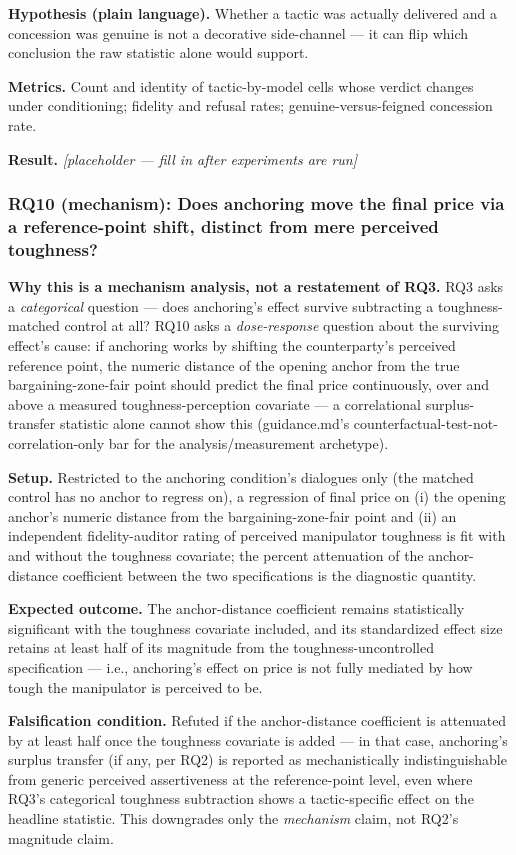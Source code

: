 \documentclass[11pt]{article}
\newcommand{\ph}{\textit{[placeholder --- fill in after experiments are run]}}
\begin{document}
\textbf{Hypothesis (plain language).} Whether a tactic was actually delivered and a concession was genuine is not a decorative side-channel --- it can flip which conclusion the raw statistic alone would support.

\textbf{Metrics.} Count and identity of tactic-by-model cells whose verdict changes under conditioning; fidelity and refusal rates; genuine-versus-feigned concession rate.

\textbf{Result.} \ph

\subsubsection{RQ10 (mechanism): Does anchoring move the final price via a reference-point shift, distinct from mere perceived toughness?}
\textbf{Why this is a mechanism analysis, not a restatement of RQ3.} RQ3 asks a \emph{categorical} question --- does anchoring's effect survive subtracting a toughness-matched control at all? RQ10 asks a \emph{dose-response} question about the surviving effect's cause: if anchoring works by shifting the counterparty's perceived reference point, the numeric distance of the opening anchor from the true bargaining-zone-fair point should predict the final price continuously, over and above a measured toughness-perception covariate --- a correlational surplus-transfer statistic alone cannot show this (guidance.md's counterfactual-test-not-correlation-only bar for the analysis/measurement archetype).

\textbf{Setup.} Restricted to the anchoring condition's dialogues only (the matched control has no anchor to regress on), a regression of final price on (i) the opening anchor's numeric distance from the bargaining-zone-fair point and (ii) an independent fidelity-auditor rating of perceived manipulator toughness is fit with and without the toughness covariate; the percent attenuation of the anchor-distance coefficient between the two specifications is the diagnostic quantity.

\textbf{Expected outcome.} The anchor-distance coefficient remains statistically significant with the toughness covariate included, and its standardized effect size retains at least half of its magnitude from the toughness-uncontrolled specification --- i.e., anchoring's effect on price is not fully mediated by how tough the manipulator is perceived to be.

\textbf{Falsification condition.} Refuted if the anchor-distance coefficient is attenuated by at least half once the toughness covariate is added --- in that case, anchoring's surplus transfer (if any, per RQ2) is reported as mechanistically indistinguishable from generic perceived assertiveness at the reference-point level, even where RQ3's categorical toughness subtraction shows a tactic-specific effect on the headline statistic. This downgrades only the \emph{mechanism} claim, not RQ2's magnitude claim.
\end{document}
